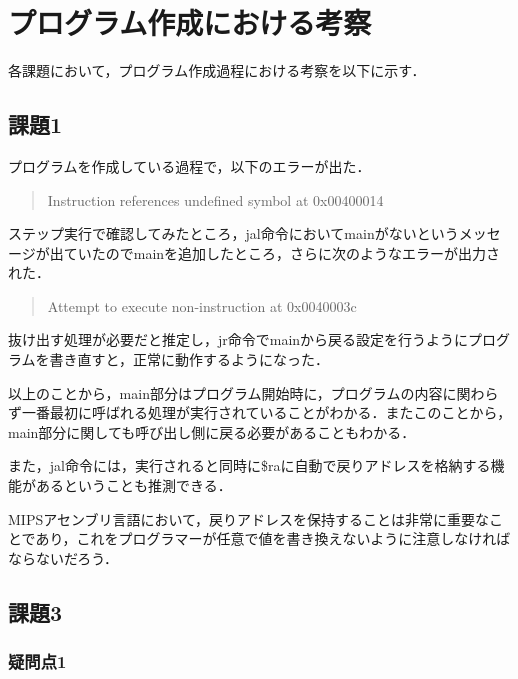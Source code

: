 \documentclass[a4j]{jarticle}
\begin{document}



%
%

\section{プログラム作成における考察}

各課題において，プログラム作成過程における考察を以下に示す．

\subsection{課題1}

プログラムを作成している過程で，以下のエラーが出た．

\begin{quote}
Instruction references undefined symbol at 0x00400014
\end{quote}

ステップ実行で確認してみたところ，jal命令においてmainがないというメッセージが出ていたのでmainを追加したところ，さらに次のようなエラーが出力された．

\begin{quote}
Attempt to execute non-instruction at 0x0040003c
\end{quote}

抜け出す処理が必要だと推定し，jr命令でmainから戻る設定を行うようにプログラムを書き直すと，正常に動作するようになった．

以上のことから，main部分はプログラム開始時に，プログラムの内容に関わらず一番最初に呼ばれる処理が実行されていることがわかる．またこのことから，main部分に関しても呼び出し側に戻る必要があることもわかる．

また，jal命令には，実行されると同時に\$raに自動で戻りアドレスを格納する機能があるということも推測できる．

MIPSアセンブリ言語において，戻りアドレスを保持することは非常に重要なことであり，これをプログラマーが任意で値を書き換えないように注意しなければならないだろう．




\subsection{課題3}

\subsubsection{疑問点1}
\end{document}
